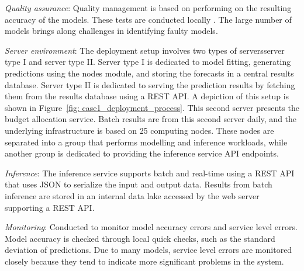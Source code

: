 \textit{Quality assurance}: Quality management is based on performing \DIFdelbegin {}\DIFdelend \DIFaddbegin {}\DIFaddend on the resulting accuracy of the models. These tests are conducted locally \DIFdelbegin {}\DIFdelend \DIFaddbegin {}\DIFaddend . The large number of models brings along challenges in identifying faulty models.

\textit{Server environment}: The deployment setup involves two types of servers\DIFdelbegin {}\DIFdelend \DIFaddbegin \DIFadd{: }\DIFaddend server type I and server type II. Server type I is dedicated to model fitting, generating predictions using the nodes module, and storing the forecasts in a central results database. Server type II is dedicated to serving the prediction results by fetching them from the results database using a REST API. A depiction of this setup is shown in Figure~\ref{fig: case1_deployment_process}. This second server presents the budget allocation service. Batch results are \DIFdelbegin {}\DIFdelend \DIFaddbegin {}\DIFaddend from this second server daily, and the underlying infrastructure is based on 25 computing nodes. These nodes are separated into a group that performs modelling and inference workloads, while another group is dedicated to providing the inference service API endpoints.

\textit{Inference}: The inference service supports batch and real-time \DIFdelbegin {}\DIFdelend \DIFaddbegin {}\DIFaddend using a REST API that uses JSON to serialize the input and output data. Results from batch inference are stored in an internal data lake accessed by the web server supporting a REST API.

\textit{Monitoring}: Conducted to monitor model accuracy errors and service level errors. Model accuracy is checked through local quick checks, such as the standard deviation of predictions. Due to many models, service level errors are monitored closely because they tend to indicate more significant problems in the system.



